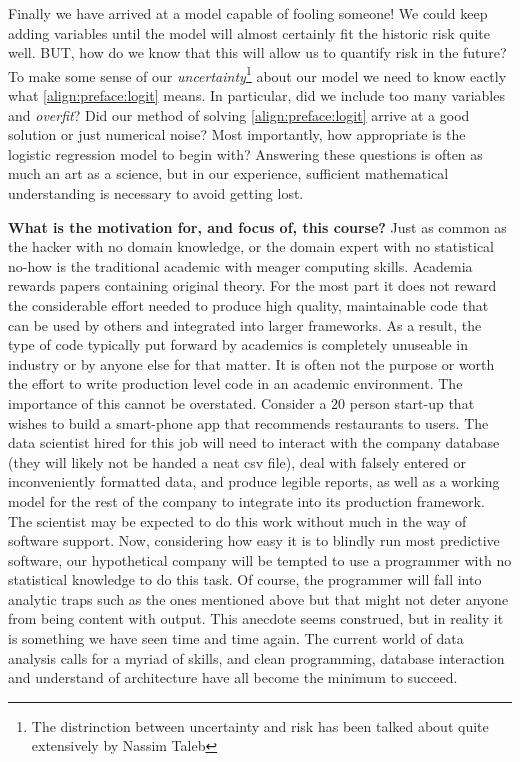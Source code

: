 Finally we have arrived at a model capable of fooling someone!  We could keep adding  variables until the model will almost certainly fit the historic risk quite well.  BUT, how do we know that this will allow us to quantify risk in the future? 
To make some sense of our \emph{uncertainty}\footnote{The distrinction between uncertainty and risk has been talked about quite extensively by Nassim Taleb\cite{TalebFooled,TalebBlack}} about our model we need to know eactly what
\eqref{align:preface:logit} means.   In particular, did we include too many variables and \emph{overfit}?  Did our method of solving \eqref{align:preface:logit} arrive at a good solution or just numerical noise?  Most importantly, 
how appropriate is the logistic regression model to begin with?  Answering these questions is often as much an art as a science, but in our experience, sufficient mathematical understanding is necessary to avoid getting lost.


\textbf{What is the motivation for, and focus of, this course?}
Just as common as the hacker with no domain knowledge, or the domain expert with no statistical no-how is the traditional academic with meager computing skills.  Academia rewards papers containing original theory.  For the most part 
it does not reward the considerable effort needed to produce high quality, maintainable code that can be used by others and integrated into larger frameworks.  
As a result, the type of code typically put forward by academics is completely unuseable in industry or by anyone else for that matter. It is often not the purpose or worth the effort to write production level code
in an academic environment. The importance of this cannot be overstated.  Consider a 20 person start-up that wishes to build a smart-phone app that recommends restaurants to users.  
The data scientist hired for this job will need to interact with the company database (they will likely not be handed a neat csv file), deal with falsely entered or inconveniently formatted data, and produce legible reports, 
as well as a working model for the rest of the company to integrate into its production framework. The scientist may be expected to do this work without much in the way of software support.  Now, considering how easy it is to 
blindly run most predictive software, our hypothetical company will be tempted to use a programmer with no statistical knowledge to do this task.  Of course, the programmer will fall into analytic traps such as the ones mentioned above but 
that might not deter anyone from being content with output. This anecdote seems construed, but in reality it is something we have seen time and time again. The current world of data analysis calls for a myriad of skills, 
and clean programming, database interaction and understand of architecture have all become the minimum to succeed. 

